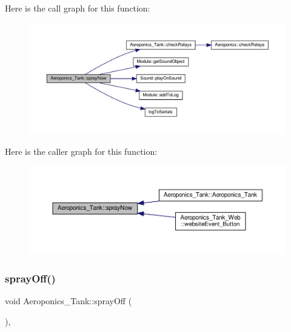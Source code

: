 Here is the call graph for this function\+:
\nopagebreak
\begin{figure}[H]
\begin{center}
\leavevmode
\includegraphics[width=350pt]{class_aeroponics___tank_ab4158b1a54f6a1ac4f3eb35fc8854e35_cgraph}
\end{center}
\end{figure}
Here is the caller graph for this function\+:
\nopagebreak
\begin{figure}[H]
\begin{center}
\leavevmode
\includegraphics[width=350pt]{class_aeroponics___tank_ab4158b1a54f6a1ac4f3eb35fc8854e35_icgraph}
\end{center}
\end{figure}
\mbox{\label{class_aeroponics___tank_aa97abbd76332098f8662b78c451deee5}} 
\subsubsection{\texorpdfstring{spray\+Off()}{sprayOff()}\hspace{0.1cm}{\footnotesize\ttfamily [1/2]}}
{\footnotesize\ttfamily void Aeroponics\+\_\+\+Tank\+::spray\+Off (\begin{DoxyParamCaption}{ }\end{DoxyParamCaption})\hspace{0.3cm}{\ttfamily [protected]}, {\ttfamily [virtual]}}



